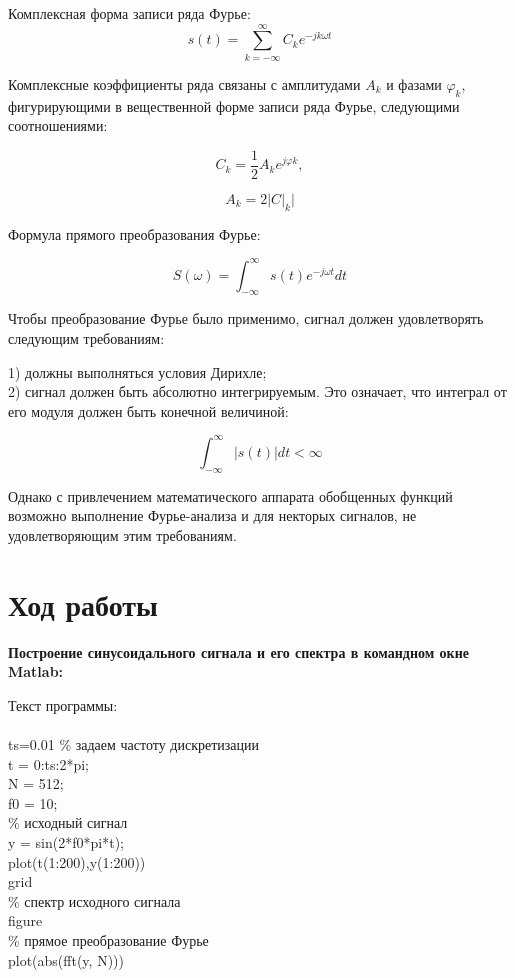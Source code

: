 \documentclass[12pt,a4paper]{scrartcl}
\begin{document}
Комплексная форма записи ряда Фурье:
$$s(t)=\sum_{k=-\infty}^\infty C_k e^{-jk\omega t}$$

Комплексные коэффициенты ряда связаны с амплитудами $A_k$ и фазами $\varphi _k$, фигурирующими в вещественной форме записи ряда Фурье, следующими соотношениями:

$$C_k = \frac{1}{2}A_k e^{j\varphi k},$$

$$A_k = 2|C|_k|$$

Формула прямого преобразования Фурье:

$$S(\omega) = \int_{-\infty}^\infty s(t) e^{-j\omega t} dt$$

Чтобы преобразование Фурье было применимо, сигнал должен удовлетворять следующим требованиям:

1) должны выполняться условия Дирихле;\\
2) сигнал должен быть абсолютно интегрируемым. Это означает, что интеграл от его модуля должен быть конечной величиной:

$$\int_{-\infty}^\infty|s(t)|dt<\infty$$

Однако с привлечением математического аппарата обобщенных функций возможно выполнение Фурье-анализа и для некторых сигналов, не удовлетворяющим этим требованиям.
\\


\section{Ход работы}
\textbf{Построение синусоидального сигнала и его спектра в командном окне Matlab:\\}

Текст программы:\\
\\
ts=0.01 \% задаем частоту дискретизации\\
t = 0:ts:2*pi; \\
N = 512;\\
f0 = 10;\\
\% исходный сигнал\\
y = sin(2*f0*pi*t);\\
plot(t(1:200),y(1:200)) \\
grid\\
\% спектр исходного сигнала\\
figure\\
\% прямое преобразование Фурье\\
plot(abs(fft(y, N)))\\
\end{document}
